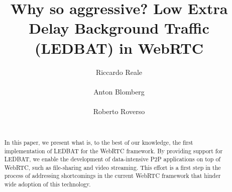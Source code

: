 \documentclass{sig-alternate}
\begin{document}


\title{Why so aggressive? Low Extra Delay Background Traffic (LEDBAT) in WebRTC}


\author{
\alignauthor
Riccardo Reale\\
      \\
\alignauthor
Anton Blomberg\\
      \\
\alignauthor
Roberto Roverso\\
      \\
}

\newcommand{\mysec}[1]{\vspace*{-0.0cm}\section{#1}}
\newcommand{\mysubsec}[1]{\vspace*{-0.0cm}\subsection{#1}\vspace*{0cm}}
\newcommand{\mysubsubsec}[1]{\vspace*{-0.0cm}\subsubsection{#1}\vspace*{0cm}}
\newcommand{\mypar}[1]{\vspace*{-0cm}\paragraph{#1}\vspace*{0cm}}

\maketitle

\begin{abstract}
  In this paper, we present what is, to the best of our knowledge, the first
  implementation of LEDBAT for the WebRTC framework. By providing support for LEDBAT, we
  enable the development of data-intensive P2P applications on top of WebRTC, such as
  file-sharing and video streaming. This effort is a first step in the process of
  addressing shortcomings in the current WebRTC framework that hinder wide adoption
  of this technology. 
\end{abstract}
\end{document}
